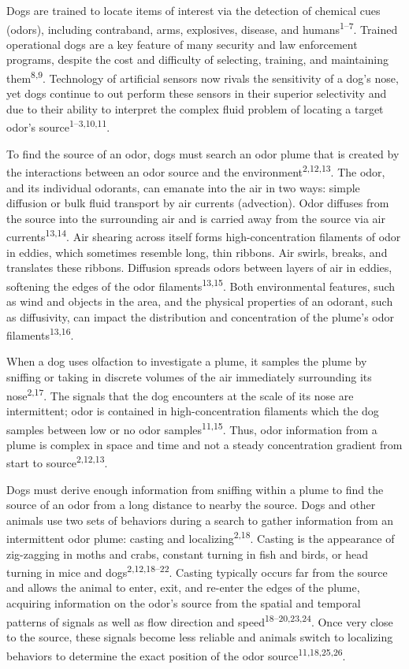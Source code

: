 \documentclass[
]{article}
\begin{document}
Dogs are trained to locate items of interest via the detection of chemical cues (odors), including contraband, arms, explosives, disease, and humans\textsuperscript{1--7}. Trained operational dogs are a key feature of many security and law enforcement programs, despite the cost and difficulty of selecting, training, and maintaining them\textsuperscript{8,9}. Technology of artificial sensors now rivals the sensitivity of a dog's nose, yet dogs continue to out perform these sensors in their superior selectivity and due to their ability to interpret the complex fluid problem of locating a target odor's source\textsuperscript{1--3,10,11}.

To find the source of an odor, dogs must search an odor plume that is created by the interactions between an odor source and the environment\textsuperscript{2,12,13}. The odor, and its individual odorants, can emanate into the air in two ways: simple diffusion or bulk fluid transport by air currents (advection). Odor diffuses from the source into the surrounding air and is carried away from the source via air currents\textsuperscript{13,14}. Air shearing across itself forms high-concentration filaments of odor in eddies, which sometimes resemble long, thin ribbons. Air swirls, breaks, and translates these ribbons. Diffusion spreads odors between layers of air in eddies, softening the edges of the odor filaments\textsuperscript{13,15}. Both environmental features, such as wind and objects in the area, and the physical properties of an odorant, such as diffusivity, can impact the distribution and concentration of the plume's odor filaments\textsuperscript{13,16}.

When a dog uses olfaction to investigate a plume, it samples the plume by sniffing or taking in discrete volumes of the air immediately surrounding its nose\textsuperscript{2,17}. The signals that the dog encounters at the scale of its nose are intermittent; odor is contained in high-concentration filaments which the dog samples between low or no odor samples\textsuperscript{11,15}. Thus, odor information from a plume is complex in space and time and not a steady concentration gradient from start to source\textsuperscript{2,12,13}.

Dogs must derive enough information from sniffing within a plume to find the source of an odor from a long distance to nearby the source. Dogs and other animals use two sets of behaviors during a search to gather information from an intermittent odor plume: casting and localizing\textsuperscript{2,18}. Casting is the appearance of zig-zagging in moths and crabs, constant turning in fish and birds, or head turning in mice and dogs\textsuperscript{2,12,18--22}. Casting typically occurs far from the source and allows the animal to enter, exit, and re-enter the edges of the plume, acquiring information on the odor's source from the spatial and temporal patterns of signals as well as flow direction and speed\textsuperscript{18--20,23,24}. Once very close to the source, these signals become less reliable and animals switch to localizing behaviors to determine the exact position of the odor source\textsuperscript{11,18,25,26}.
\end{document}
